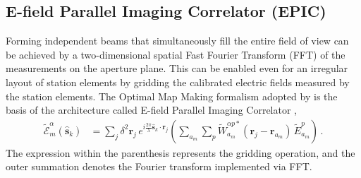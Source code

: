 \documentclass[
  journal=pasa,
  manuscript=article-type,
  year=2020,
  volume=37,
]{cup-journal}
\begin{document}
\subsection{E-field Parallel Imaging Correlator (EPIC)}

Forming independent beams that simultaneously fill the entire field of view can be achieved by a two-dimensional spatial Fast Fourier Transform (FFT) of the measurements on the aperture plane. This can be enabled even for an irregular layout of station elements by gridding the calibrated electric fields measured by the station elements. The Optimal Map Making \citep[OMM;][]{Tegmark1997a} formalism adopted by \citet{Morales2011} is the basis of the architecture called E-field Parallel Imaging Correlator \cite[EPIC;][]{Thyagarajan+2017},
\begin{align}
    \widetilde{\mathcal{E}}_m^\alpha(\hat{\boldsymbol{s}}_k) &= \sum_j \delta^2 \boldsymbol{r}_j \, e^{i\frac{2\pi}{\lambda} \hat{\boldsymbol{s}}_k\cdot\boldsymbol{r}_j} \left(\sum_{a_m} \sum_p \widetilde{W}_{a_m}^{\alpha p*}(\boldsymbol{r}_j-\boldsymbol{r}_{a_m}) \, \widetilde{E}_{a_m}^p \right) \, . \label{eqn:intra-station-pol-hol-img-epic}
\end{align}
The expression within the parenthesis represents the gridding operation, and the outer summation denotes the Fourier transform implemented via FFT. 

\end{document}
